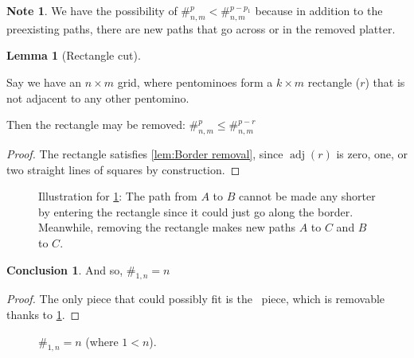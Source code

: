 \documentclass{article}
\newcommand{\pentI}{\smash{\colorbox{colorI!50}{I}}}
\theoremstyle{definition}%
\newtheorem{lemma}[theorem]{Lemma}
\newtheorem*{conclusion}{Conclusion}
\newtheorem*{note}{Note}
\newcommand{\adj}{\operatorname{adj}}
\begin{document}
\begin{note}
We have the possibility of $\#^{p}_{n, m} < \#^{p - p_1}_{n, m}$ because in addition to the preexisting paths, there are new paths that go across or in the removed platter.
\end{note}

\begin{lemma}[Rectangle cut]
\label{lem:Rectangle cut}

Say we have an $n \times m$ grid, where pentominoes form a $k \times m$ rectangle ($r$) that is not adjacent to any other pentomino.

Then the rectangle may be removed: $\#^{p}_{n, m} \le \#^{p - r}_{n, m}$
\end{lemma}

\begin{proof}
The rectangle satisfies \cref{lem:Border removal}, since $\adj(r)$ is zero, one, or two straight lines of squares by construction.
\end{proof}

\begin{figure}[htbp!]
    \centering
    \caption{Illustration for \cref{lem:Rectangle cut}: The path from $A$ to $B$ cannot be made any shorter by entering the rectangle since it could just go along the border. Meanwhile, removing the rectangle makes new paths $A$ to $C$ and $B$ to $C$.}
\end{figure}

\begin{conclusion}
And so, $\#_{1, n} = n$
\end{conclusion}

\begin{proof}
The only piece that could possibly fit is the \pentI~piece, which is removable thanks to \cref{lem:Rectangle cut}.
\end{proof}

\begin{figure}[htbp!]
    \centering
    \caption{$\#_{1, n} = n$ (where $1 < n$). \cite{sheet}}
\end{figure}
\end{document}
